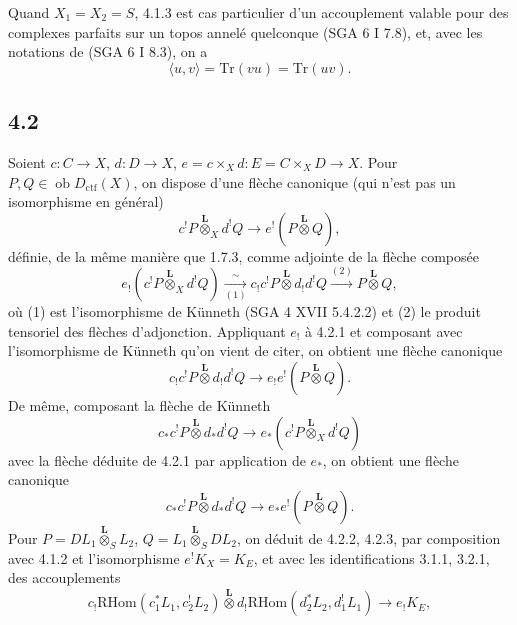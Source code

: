 \documentclass[11pt]{article}
\newcommand{\ob}{\operatorname{ob}}
\providecommand{\RHom}{\mathrm{RHom}}
\providecommand{\Dctf}{D_{\mathrm{ctf}}}
\providecommand{\Dctf}{D_{\mathrm{ctf}}}
\providecommand{\RHom}{\mathrm{RHom}}
\providecommand{\ob}{\operatorname{ob}}
\providecommand{\RHom}{\mathrm R\mathcal{H}om}
\begin{document}
Quand $X_1=X_2=S$, 4.1.3 est cas particulier d'un accouplement valable pour des complexes parfaits sur un topos annelé quelconque (SGA 6 I 7.8), et, avec les notations de (SGA 6 I 8.3), on a
\begin{equation}
\langle u,v\rangle=\mathrm{Tr}(vu)=\mathrm{Tr}(uv).
\tag{4.1.5}
\end{equation}

\subsection*{4.2}
Soient $c:C\to X$, $d:D\to X$, $e=c\times_Xd:E=C\times_XD\to X$. Pour $P,Q\in\ob\Dctf(X)$, on dispose d'une flèche canonique (qui n'est pas un isomorphisme en général)
\begin{equation}
c^!P\overset{\mathbf L}{\otimes}_X d^!Q
\longrightarrow e^!(P\overset{\mathbf L}{\otimes}Q),
\tag{4.2.1}
\end{equation}
définie, de la même manière que 1.7.3, comme adjointe de la flèche composée
\[
e_!(c^!P\overset{\mathbf L}{\otimes}_X d^!Q)
\xrightarrow[(1)]{\sim}
 c_!c^!P\overset{\mathbf L}{\otimes}d_!d^!Q
\xrightarrow{(2)} P\overset{\mathbf L}{\otimes}Q,
\]
où (1) est l'isomorphisme de Künneth (SGA 4 XVII 5.4.2.2) et (2) le produit tensoriel des flèches d'adjonction. Appliquant $e_!$ à 4.2.1 et composant avec l'isomorphisme de Künneth qu'on vient de citer, on obtient une flèche canonique
\begin{equation}
c_!c^!P\overset{\mathbf L}{\otimes}d_!d^!Q
\longrightarrow e_!e^!(P\overset{\mathbf L}{\otimes}Q).
\tag{4.2.2}
\end{equation}
De même, composant la flèche de Künneth
\[
c_*c^!P\overset{\mathbf L}{\otimes}d_*d^!Q
\longrightarrow e_*(c^!P\overset{\mathbf L}{\otimes}_X d^!Q)
\]
avec la flèche déduite de 4.2.1 par application de $e_*$, on obtient une flèche canonique
\begin{equation}
c_*c^!P\overset{\mathbf L}{\otimes}d_*d^!Q
\longrightarrow e_*e^!(P\overset{\mathbf L}{\otimes}Q).
\tag{4.2.3}
\end{equation}
Pour $P=DL_1\overset{\mathbf L}{\otimes}_S L_2$, $Q=L_1\overset{\mathbf L}{\otimes}_S DL_2$, on déduit de 4.2.2, 4.2.3, par composition avec 4.1.2 et l'isomorphisme $e^!K_X=K_E$, et avec les identifications 3.1.1, 3.2.1, des accouplements
\begin{equation}
c_!\RHom(c_1^*L_1,c_2^!L_2)\overset{\mathbf L}{\otimes}
 d_!\RHom(d_2^*L_2,d_1^!L_1)
\longrightarrow e_!K_E,
\tag{4.2.4}
\end{equation}
\end{document}
